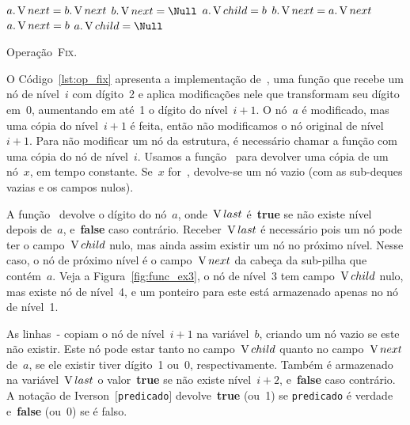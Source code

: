 \documentclass[main.tex]{subfiles}
\begin{document}
\begin{algorithm}
\begin{algorithmic}[1]
          \label{line:fix:next_a_bb}
            \State $a.\operatorname{V}{next} = b.\operatorname{V}{next}$
            \State $b.\V{next} = \Null$ \label{line:fix:next_a_be}
        \EndIf
        \State $a.\operatorname{V}{child} = b$ \label{line:fix:child_a_b}
    \Else
         \label{line:fix:next_b_ab}
            \State $b.\operatorname{V}{next} = a.\operatorname{V}{next}$  \label{line:fix:next_b_ae}
        \EndIf
        \State $a.\operatorname{V}{next} = b$ \label{line:fix:child_b_ab}
        \State $a.\V{child} = \Null$  \label{line:fix:child_b_ae}
    \EndIf
\EndFunction

\end{algorithmic}
\caption{Operação~\textsc{Fix}.} \label{lst:op_fix}
\end{algorithm}

O Código~\ref{lst:op_fix} apresenta a implementação de~, uma função que recebe um nó de nível~$i$ com dígito~2 e aplica modificações nele que transformam seu dígito em~0, aumentando em até~1 o dígito do nível~$i+1$. O nó~$a$ é modificado, mas uma cópia do nível~$i+1$ é feita, então não modificamos o nó original de nível~$i+1$. Para não modificar um nó da estrutura, é necessário chamar a função com uma cópia do nó de nível~$i$. Usamos a função~ para devolver uma cópia de um nó~$x$, em tempo constante. Se~$x$ for~, devolve-se um nó vazio (com as sub-deques vazias e os campos nulos).

A função~ devolve o dígito do nó~$a$, onde~$\operatorname{V}{last}$ é~\textbf{true} se não existe nível depois de~$a$, e~\textbf{false} caso contrário. Receber~$\operatorname{V}{last}$ é necessário pois um nó pode ter o campo~$\operatorname{V}{child}$ nulo, mas ainda assim existir um nó no próximo nível. Nesse caso, o nó de próximo nível é o campo~$\operatorname{V}{next}$ da cabeça da sub-pilha que contém~$a$. Veja a Figura~\ref{fig:func_ex3}, o nó de nível~3 tem campo~$\operatorname{V}{child}$ nulo, mas existe nó de nível~4, e um ponteiro para este está armazenado apenas no nó de nível~1.

As linhas~{-} copiam o nó de nível~$i+1$ na variável~$b$, criando um nó vazio se este não existir. Este nó pode estar tanto no campo~$\operatorname{V}{child}$ quanto no campo~$\operatorname{V}{next}$ de~$a$, se ele existir tiver dígito~1 ou~0, respectivamente.
Também é armazenado na variável~$\operatorname{V}{last}$ o valor~\textbf{true} se não existe nível~$i+2$, e~\textbf{false} caso contrário. A notação de Iverson~$[$\texttt{predicado}$]$ devolve~\textbf{true} (ou~1) se \texttt{predicado} é verdade e~\textbf{false} (ou~0) se é falso.
\end{document}
